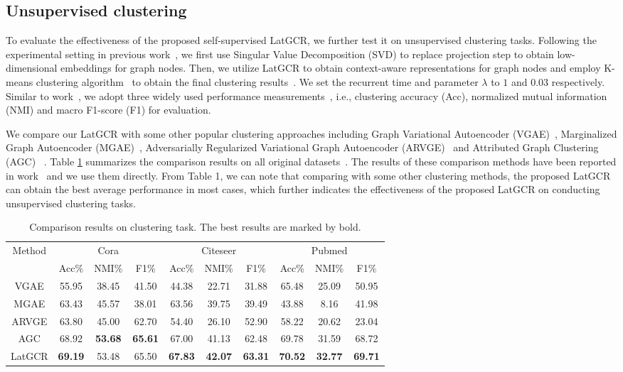 \documentclass{article}
\begin{document}
\subsection{Unsupervised clustering}

To evaluate the effectiveness of the proposed self-supervised LatGCR, we further test it on
unsupervised clustering tasks.
Following the experimental setting in previous work~\cite{AGCN},
we first use Singular Value Decomposition (SVD) to replace projection step to obtain low-dimensional embeddings  for graph nodes.
Then, we utilize LatGCR to obtain context-aware representations for graph nodes and employ K-means clustering algorithm~\cite{cluster} to obtain the final clustering results~\cite{AGCN}.
We set the recurrent time and parameter $\lambda$ to $1$ and $0.03$ respectively.
Similar to work~\cite{AGCN}, we adopt three widely used performance measurements~\cite{cluster}, i.e., clustering accuracy (Acc), normalized mutual information (NMI) and macro F1-score (F1) for evaluation.

We compare our LatGCR with some other popular clustering approaches including Graph Variational Autoencoder (VGAE)~\cite{GAE}, Marginalized Graph Autoencoder (MGAE)~\cite{MGAE}, Adversarially Regularized Variational Graph Autoencoder (ARVGE)~\cite{ARGE} and Attributed Graph Clustering (AGC) ~\cite{AGCN}.
Table \ref{tab:result-cluster} summarizes the comparison results on all original datasets~\cite{sen2008collective}.
The results of these comparison methods have been reported in work~\cite{AGCN} and we use them directly.
From Table 1, we can note that comparing with some other clustering methods, the proposed LatGCR can obtain the best average performance in most cases,
which further indicates the effectiveness of the proposed LatGCR on conducting unsupervised clustering tasks.
\begin{table}[!htpb]
\centering
\caption{\upshape Comparison results on clustering task. The best results are marked by bold.}
\label{tab:result-cluster}
\small
\renewcommand\arraystretch{1.1}
\begin{tabular}{c|ccc|ccc|ccc}
  \hline
  \hline
   \multirow{2}{*}{Method}& \multicolumn{3}{c|}{Cora}& \multicolumn{3}{c|}{Citeseer}& \multicolumn{3}{c}{Pubmed}\\
  \cline{2-10}
 &Acc\%&NMI\%&F1\% &Acc\%&NMI\%&F1\% &Acc\%&NMI\%&F1\%   \\
  \hline
   VGAE      & 55.95&38.45&41.50&44.38&22.71&31.88&65.48&25.09&50.95\\
   MGAE      & 63.43&45.57&38.01&63.56&39.75&39.49&43.88&8.16&41.98\\
   ARVGE     & 63.80&45.00&62.70&54.40&26.10&52.90&58.22&20.62&23.04\\
   AGC       & 68.92&\textbf{53.68}&\textbf{65.61}&67.00&41.13&62.48&69.78&31.59&68.72\\
   \hline
   LatGCR    & \textbf{69.19}&53.48&65.50 & \textbf{67.83}&\textbf{42.07}&\textbf{63.31} & \textbf{70.52}&\textbf{32.77}&\textbf{69.71}\\
  \hline
  \hline
\end{tabular}
\end{table}
\end{document}
